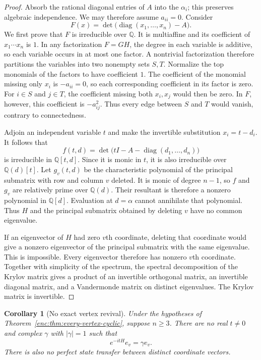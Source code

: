 \documentclass[11pt,a4paper]{article}
\newtheorem{corollary}[theorem]{Corollary}
\theoremstyle{definition}
\theoremstyle{remark}
\numberwithin{equation}{section}
\begin{document}
\begin{proof}
Absorb the rational diagonal entries of $A$ into the $\alpha_i$;
this preserves algebraic independence.  We may therefore assume
$a_{ii}=0$.  Consider
\[
 F(x)=\det\bigl(\operatorname{diag}(x_1,\ldots,x_n)-A\bigr).
\]
We first prove that $F$ is irreducible over $\mathbb Q$.
It is multiaffine and its coefficient of $x_1\cdots x_n$ is $1$.
In any factorization $F=GH$, the degree in each variable is additive,
so each variable occurs in at most one factor.  A nontrivial
factorization therefore partitions the variables into two nonempty
sets $S,T$.  Normalize the top monomials of the factors to have
coefficient $1$.  The coefficient of the monomial missing only $x_i$
is $-a_{ii}=0$, so each corresponding coefficient in its factor is
zero.  For $i\in S$ and $j\in T$, the coefficient missing both
$x_i,x_j$ would then be zero.  In $F$, however, this coefficient is
$-a_{ij}^2$.  Thus every edge between $S$ and $T$ would vanish,
contrary to connectedness.

Adjoin an independent variable $t$ and make the invertible substitution
$x_i=t-d_i$.  It follows that
\[
 f(t,d)=\det\bigl(tI-A-\operatorname{diag}(d_1,\ldots,d_n)\bigr)
\]
is irreducible in $\mathbb Q[t,d]$.  Since it is monic in $t$, it is
also irreducible over $\mathbb Q(d)[t]$.  Let $g_v(t,d)$ be the
characteristic polynomial of the principal submatrix with row and
column $v$ deleted.  It is monic of degree $n-1$, so $f$ and $g_v$
are relatively prime over $\mathbb Q(d)$.  Their resultant is therefore
a nonzero polynomial in $\mathbb Q[d]$.  Evaluation at $d=\alpha$
cannot annihilate that polynomial.  Thus $H$ and the principal
submatrix obtained by deleting $v$ have no common eigenvalue.

If an eigenvector of $H$ had zero $v$th coordinate, deleting that
coordinate would give a nonzero eigenvector of the principal
submatrix with the same eigenvalue.  This is impossible.  Every
eigenvector therefore has nonzero $v$th coordinate.  Together with
simplicity of the spectrum, the spectral decomposition of the Krylov
matrix gives a product of an invertible orthogonal matrix, an
invertible diagonal matrix, and a Vandermonde matrix on distinct
eigenvalues.  The Krylov matrix is invertible.
\end{proof}

\begin{corollary}[No exact vertex revival]
\label{enc:cor:no-vertex-revival}
Under the hypotheses of Theorem~\ref{enc:thm:every-vertex-cyclic}, suppose
$n\ge3$.  There are no real $t\ne0$ and complex $\gamma$ with
$|\gamma|=1$ such that
\[
 e^{-itH}e_v=\gamma e_v.
\]
There is also no perfect state transfer between distinct coordinate
vectors.
\end{corollary}
\end{document}
